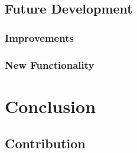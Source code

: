 \documentclass{l4proj}
\begin{document}
\section{Future Development}


\subsection{Improvements}


\subsection{New Functionality}


\chapter{Conclusion}


\section{Contribution}



\end{document}

